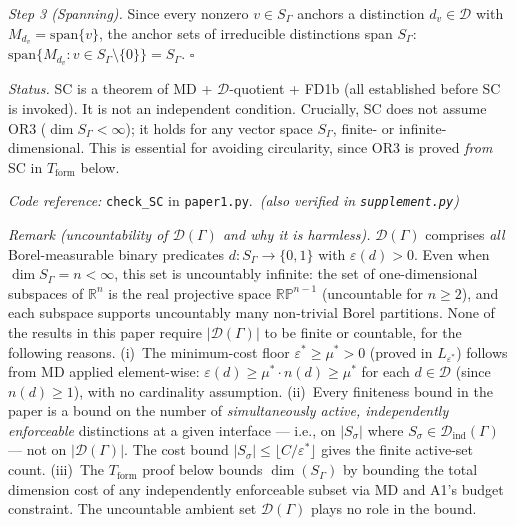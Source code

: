 \documentclass[11pt]{article}
\theoremstyle{remark}
\newcommand{\coderef}[2]{\smallskip\noindent\textit{Code reference:} \texttt{#1} in \texttt{#2}.}
\begin{document}
\begin{tcolorbox}[apfbox, title={Proposition SC (Substrate Completeness)}]
\textit{Step 3 (Spanning).}  Since every nonzero $v \in S_\Gamma$ anchors a distinction $d_v \in \mathcal{D}$ with $M_{d_v} = \mathrm{span}\{v\}$, the anchor sets of irreducible distinctions span $S_\Gamma$: $\mathrm{span}\{M_{d_v} : v \in S_\Gamma \setminus \{0\}\} = S_\Gamma$.  \hfill$\square$

\smallskip\noindent\textit{Status.}  SC is a theorem of MD + $\mathcal{D}$-quotient + FD1b (all established before SC is invoked).  It is not an independent condition.  Crucially, SC does not assume OR3 ($\dim S_\Gamma < \infty$); it holds for any vector space $S_\Gamma$, finite- or infinite-dimensional.  This is essential for avoiding circularity, since OR3 is proved \emph{from} SC in $T_{\mathrm{form}}$ below.

\coderef{check\_SC}{paper1.py}\,%
\hspace{1em}\textit{(also verified in \texttt{supplement.py})}
\end{tcolorbox}

\smallskip\noindent\textit{Remark (uncountability of $\mathcal{D}(\Gamma)$ and why it is harmless).}  $\mathcal{D}(\Gamma)$ comprises \emph{all} Borel-measurable binary predicates $d: S_\Gamma \to \{0,1\}$ with $\varepsilon(d) > 0$.  Even when $\dim S_\Gamma = n < \infty$, this set is uncountably infinite: the set of one-dimensional subspaces of $\mathbb{R}^n$ is the real projective space $\mathbb{RP}^{n-1}$ (uncountable for $n \ge 2$), and each subspace supports uncountably many non-trivial Borel partitions.  None of the results in this paper require $|\mathcal{D}(\Gamma)|$ to be finite or countable, for the following reasons.  (i)~The minimum-cost floor $\varepsilon^* \ge \mu^* > 0$ (proved in $L_{\varepsilon^*}$) follows from MD applied element-wise: $\varepsilon(d) \ge \mu^* \cdot n(d) \ge \mu^*$ for each $d \in \mathcal{D}$ (since $n(d) \ge 1$), with no cardinality assumption.  (ii)~Every finiteness bound in the paper is a bound on the number of \emph{simultaneously active, independently enforceable} distinctions at a given interface --- i.e., on $|S_\sigma|$ where $S_\sigma \in \mathcal{D}_{\mathrm{ind}}(\Gamma)$ --- not on $|\mathcal{D}(\Gamma)|$.  The cost bound $|S_\sigma| \le \lfloor C/\varepsilon^* \rfloor$ gives the finite active-set count.  (iii)~The $T_{\mathrm{form}}$ proof below bounds $\dim(S_\Gamma)$ by bounding the total dimension cost of any independently enforceable subset via MD and A1's budget constraint.  The uncountable ambient set $\mathcal{D}(\Gamma)$ plays no role in the bound.
\end{document}
